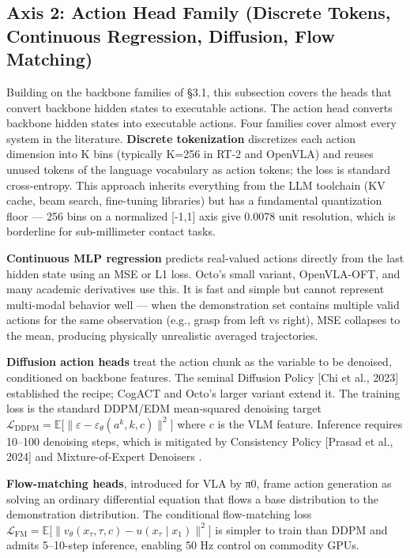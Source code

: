 \documentclass{article}
\begin{document}
\subsection{Axis 2: Action Head Family (Discrete Tokens, Continuous Regression, Diffusion, Flow Matching)}\label{axis-2-action-head-family-discrete-tokens-continuous-regression-diffusion-flow-matching}

Building on the backbone families of §3.1, this subsection covers the heads that convert backbone hidden states to executable actions. The action head converts backbone hidden states into executable actions. Four families cover almost every system in the literature. \textbf{Discrete tokenization} discretizes each action dimension into K bins (typically K=256 in RT-2 and OpenVLA) and reuses unused tokens of the language vocabulary as action tokens; the loss is standard cross-entropy. This approach inherits everything from the LLM toolchain (KV cache, beam search, fine-tuning libraries) but has a fundamental quantization floor --- 256 bins on a normalized {[}-1,1{]} axis give 0.0078 unit resolution, which is borderline for sub-millimeter contact tasks.

\textbf{Continuous MLP regression} predicts real-valued actions directly from the last hidden state using an MSE or L1 loss. Octo's small variant, OpenVLA-OFT, and many academic derivatives use this. It is fast and simple but cannot represent multi-modal behavior well --- when the demonstration set contains multiple valid actions for the same observation (e.g., grasp from left vs right), MSE collapses to the mean, producing physically unrealistic averaged trajectories.

\textbf{Diffusion action heads} treat the action chunk as the variable to be denoised, conditioned on backbone features. The seminal Diffusion Policy {[}Chi et al., 2023{]} established the recipe; CogACT and Octo's larger variant extend it. The training loss is the standard DDPM/EDM mean-squared denoising target \(\mathcal{L}_{\text{DDPM}} = \mathbb{E}\big[\|\varepsilon - \varepsilon_\theta(a^k, k, c)\|^2\big]\) where \(c\) is the VLM feature. Inference requires 10--100 denoising steps, which is mitigated by Consistency Policy {[}Prasad et al., 2024{]} and Mixture-of-Expert Denoisers \cite{reuss2024efficientdiffusion}.

\textbf{Flow-matching heads}, introduced for VLA by π0, frame action generation as solving an ordinary differential equation that flows a base distribution to the demonstration distribution. The conditional flow-matching loss \(\mathcal{L}_{\text{FM}} = \mathbb{E}\big[\|v_\theta(x_\tau, \tau, c) - u(x_\tau \mid x_1)\|^2\big]\) is simpler to train than DDPM and admits 5--10-step inference, enabling 50 Hz control on commodity GPUs.
\end{document}
